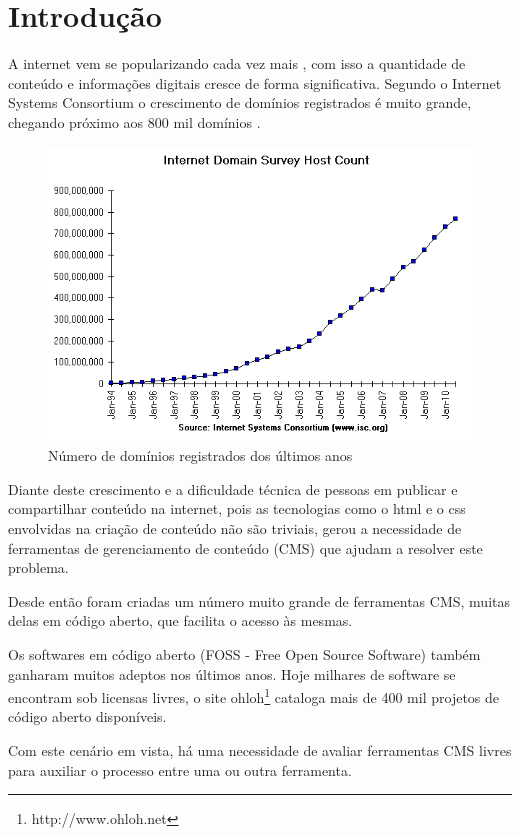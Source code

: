 \chapter{Introdução}

A internet vem se popularizando cada vez mais \cite{internet_stats}, com isso a quantidade de conteúdo e informações digitais cresce de forma significativa. Segundo o Internet Systems Consortium o crescimento de domínios registrados é muito grande, chegando próximo aos 800 mil domínios \cite{isc}. 

\begin{figure}[here]
\includegraphics[width=150mm]{images/isc_hosts.png}
\caption{Número de domínios registrados dos últimos anos}
\label{fig:isc_hosts.png}
\end{figure}

Diante deste crescimento e a dificuldade técnica de pessoas em publicar e compartilhar conteúdo na internet, pois as  tecnologias como o html e o css envolvidas na criação de conteúdo não são triviais, gerou a necessidade de ferramentas de gerenciamento de conteúdo (CMS) que ajudam a resolver este problema.  \cite{content_for_one}


Desde então foram criadas um número muito grande de ferramentas CMS, muitas delas em código aberto, que facilita o acesso às mesmas.  

Os softwares em código aberto (FOSS - Free Open Source Software) também ganharam muitos adeptos nos últimos anos. Hoje milhares de software se encontram sob licensas livres, o site ohloh\footnote{http://www.ohloh.net} cataloga mais de 400 mil projetos de código aberto disponíveis. 

Com este cenário em vista, há uma necessidade de avaliar ferramentas CMS livres para auxiliar o processo entre uma ou outra ferramenta.

